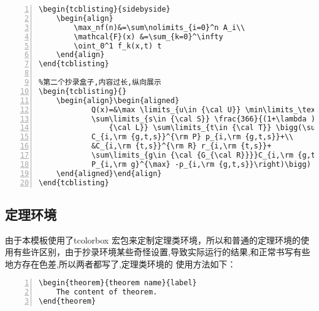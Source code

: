 \begin{lstlisting}[backgroundcolor=\color{gray!5},framerule=1pt,frame=tb,numbers=left,
    numberstyle=\tiny\color{black},]
    %第一个抄录盒子,适合内容简短,横向展示内容
\begin{tcblisting}{sidebyside}
    \begin{align}
        \max_nf(n)&=\sum\nolimits_{i=0}^n A_i\\
        \mathcal{F}(x) &=\sum_{k=0}^\infty
        \oint_0^1 f_k(x,t) t
    \end{align}
\end{tcblisting}

%第二个抄录盒子,内容过长,纵向展示
\begin{tcblisting}{}
    \begin{align}\begin{aligned}
            Q(x)=&\max \limits_{u\in {\cal U}} \min\limits_\text{p,r,q}
            \sum\limits_{s\in {\cal S}} \frac{366}{(1+\lambda )^{\rm s}}\sum\limits_{i\in
                {\cal L}} \sum\limits_{t\in {\cal T}} \bigg(\sum\limits_{g\in {\cal G}}
            C_{i,\rm {g,t,s}}^{\rm P} p_{i,\rm {g,t,s}}+\\
            &C_{i,\rm {t,s}}^{\rm R} r_{i,\rm {t,s}}+
            \sum\limits_{g\in {\cal {G_{\cal R}}}}C_{i,\rm {g,t,s}}^{\rm W} \left(u_{i,\rm {g,s}}^{+}
            P_{i,\rm g}^{\max} -p_{i,\rm {g,t,s}}\right)\bigg)
    \end{aligned}\end{align}
\end{tcblisting}
\end{lstlisting}

\subsection{定理环境}
由于本模板使用了tcolorbox 宏包来定制定理类环境，所以和普通的定理环境的使用有些许区别，由于抄录环境某些奇怪设置,导致实际运行的结果,和正常书写有些地方存在色差,所以两者都写了,定理类环境的
使用方法如下：
\begin{lstlisting}[backgroundcolor=\color{gray!5},framerule=1pt,frame=tb,numbers=left,
    numberstyle=\tiny\color{black},]
\begin{theorem}{theorem name}{label}
    The content of theorem.
\end{theorem}
\end{lstlisting}

